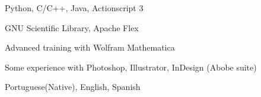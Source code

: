 

\begin{cvskills}
	
	{Python, C/C++, Java, Actionscript 3}
	
	{GNU Scientific Library, Apache Flex}
	
	{Advanced training with Wolfram Mathematica}
	
	{Some experience with Photoshop, Illustrator, InDesign (Abobe suite)}
	
	{Portuguese(Native), English, Spanish}
	
\end{cvskills}

